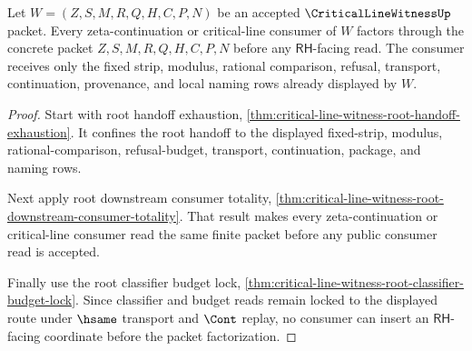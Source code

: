 \begin{theorem}
\label{thm:critical-line-witness-fixed-strip-zeta-source-factorization}
Let $W=(Z,S,M,R,Q,H,C,P,N)$ be an accepted $\CriticalLineWitnessUp$ packet.
Every zeta-continuation or critical-line consumer of $W$ factors through the
concrete packet $Z,S,M,R,Q,H,C,P,N$ before any $\mathsf{RH}$-facing read. The
consumer receives only the fixed strip, modulus, rational comparison, refusal,
transport, continuation, provenance, and local naming rows already displayed by
$W$.
\end{theorem}
\begin{proof}
Start with root handoff exhaustion,
\autoref{thm:critical-line-witness-root-handoff-exhaustion}. It confines the
root handoff to the displayed fixed-strip, modulus, rational-comparison,
refusal-budget, transport, continuation, package, and naming rows.

Next apply root downstream consumer totality,
\autoref{thm:critical-line-witness-root-downstream-consumer-totality}. That
result makes every zeta-continuation or critical-line consumer read the same
finite packet before any public consumer read is accepted.

Finally use the root classifier budget lock,
\autoref{thm:critical-line-witness-root-classifier-budget-lock}. Since
classifier and budget reads remain locked to the displayed route under
$\hsame$ transport and $\Cont$ replay, no consumer can insert an
$\mathsf{RH}$-facing coordinate before the packet factorization.
\end{proof}

